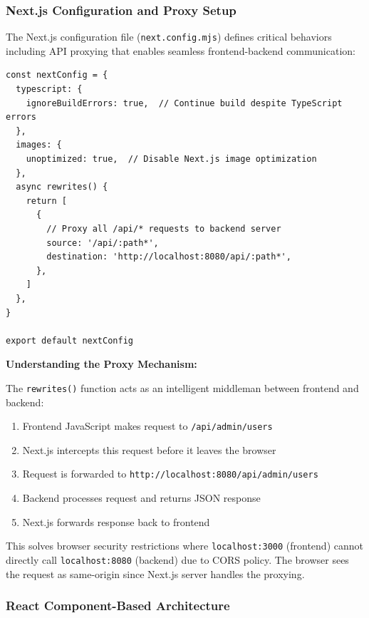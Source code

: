 \subsubsection{Next.js Configuration and Proxy Setup}

The Next.js configuration file (\texttt{next.config.mjs}) defines critical behaviors including API proxying that enables seamless frontend-backend communication:

\begin{lstlisting}[style=code, caption=Next.js Configuration with API Proxy]
const nextConfig = {
  typescript: {
    ignoreBuildErrors: true,  // Continue build despite TypeScript errors
  },
  images: {
    unoptimized: true,  // Disable Next.js image optimization
  },
  async rewrites() {
    return [
      {
        // Proxy all /api/* requests to backend server
        source: '/api/:path*',
        destination: 'http://localhost:8080/api/:path*',
      },
    ]
  },
}

export default nextConfig
\end{lstlisting}

\begin{mdframed}[backgroundcolor=green!5, linecolor=green!40, linewidth=2pt]
\textbf{Understanding the Proxy Mechanism:}

The \texttt{rewrites()} function acts as an intelligent middleman between frontend and backend:

\begin{enumerate}
    \item Frontend JavaScript makes request to \texttt{/api/admin/users}
    \item Next.js intercepts this request before it leaves the browser
    \item Request is forwarded to \texttt{http://localhost:8080/api/admin/users}
    \item Backend processes request and returns JSON response
    \item Next.js forwards response back to frontend
\end{enumerate}

This solves browser security restrictions where \texttt{localhost:3000} (frontend) cannot directly call \texttt{localhost:8080} (backend) due to CORS policy. The browser sees the request as same-origin since Next.js server handles the proxying.
\end{mdframed}

\subsubsection{React Component-Based Architecture}


